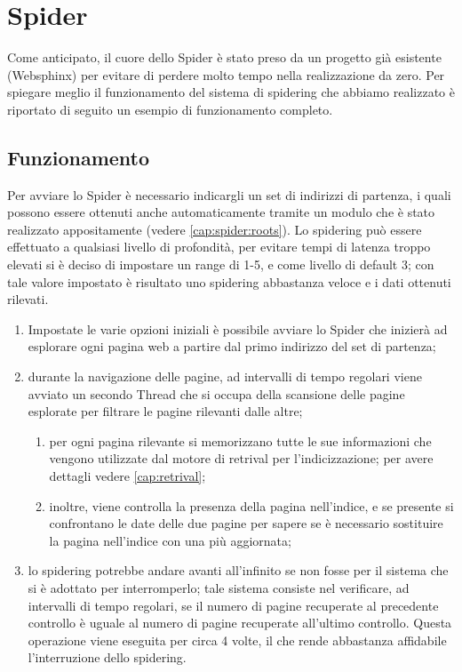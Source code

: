 \chapter{Spider}\label{cap:spider}
Come anticipato, il cuore dello Spider è stato preso da un progetto già esistente (Websphinx) per evitare di perdere molto tempo nella realizzazione da zero. Per spiegare meglio il funzionamento del sistema di spidering che abbiamo realizzato è riportato di seguito un esempio di funzionamento completo.
\section{Funzionamento}
Per avviare lo Spider è necessario indicargli un set di indirizzi di partenza, i quali possono essere ottenuti anche automaticamente tramite un modulo che è stato realizzato appositamente (vedere \ref{cap:spider:roots}). Lo spidering può essere effettuato a qualsiasi livello di profondità, per evitare tempi di latenza troppo elevati si è deciso di impostare un range di 1-5, e come livello di default 3; con tale valore impostato è risultato uno spidering abbastanza veloce e i dati ottenuti rilevati.
\begin{enumerate}
\item Impostate le varie opzioni iniziali è possibile avviare lo Spider che inizierà ad esplorare ogni pagina web a partire dal primo indirizzo del set di partenza;
\item durante la navigazione delle pagine, ad intervalli di tempo regolari viene avviato un secondo Thread che si occupa della scansione delle pagine esplorate per filtrare le pagine rilevanti dalle altre;
	\begin{enumerate}
	\item per ogni pagina rilevante si memorizzano tutte le sue informazioni che vengono utilizzate dal motore di retrival per 				l'indicizzazione; per avere dettagli vedere \ref{cap:retrival};
	\item inoltre, viene controlla la presenza della pagina nell'indice, e se presente si confrontano le date delle due pagine per 			sapere se è necessario sostituire la pagina nell'indice con una più aggiornata;
	\end{enumerate}
\item lo spidering potrebbe andare avanti all'infinito se non fosse per il sistema che si è adottato per interromperlo; tale sistema consiste nel verificare, ad intervalli di tempo regolari, se il numero di pagine recuperate al precedente controllo è uguale al numero di pagine recuperate all'ultimo controllo. Questa operazione viene eseguita per circa 4 volte, il che rende abbastanza affidabile l'interruzione dello spidering.
\end{enumerate}
